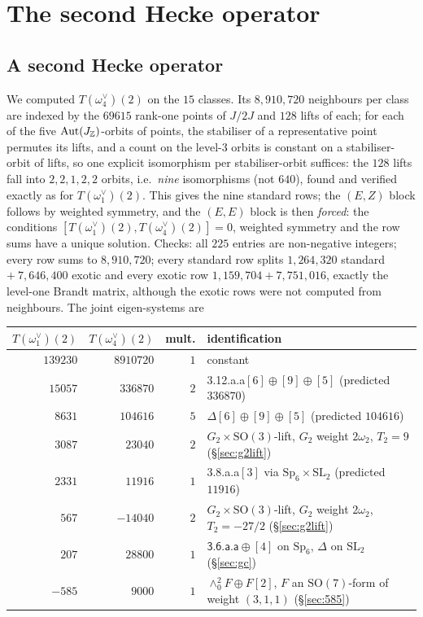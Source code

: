 \documentclass[11pt]{amsart}
\theoremstyle{definition}
\newcommand{\Z}{\mathbb{Z}}\newcommand{\Q}{\mathbb{Q}}\newcommand{\R}{\mathbb{R}}\newcommand{\A}{\mathbb{A}}\newcommand{\F}{\mathbb{F}}
\begin{document}
\section{The second Hecke operator}
\subsection{A second Hecke operator}\label{sec:T4} We computed $T(\omega_4^\vee)(2)$ on the $15$ classes. Its $8{,}910{,}720$ neighbours per class are indexed by the $69615$ rank-one points of $J/2J$ and $128$ lifts of each; for each of the five $\Aut(J_\Z)$-orbits of points, the stabiliser of a representative point permutes its lifts, and a count on the level-$3$ orbits is constant on a stabiliser-orbit of lifts, so one explicit isomorphism per stabiliser-orbit suffices: the $128$ lifts fall into $2,2,1,2,2$ orbits, i.e.\ \emph{nine} isomorphisms (not $640$), found and verified exactly as for $T(\omega_1^\vee)(2)$. This gives the nine standard rows; the $(E,Z)$ block follows by weighted symmetry, and the $(E,E)$ block is then \emph{forced}: the conditions $[T(\omega_1^\vee)(2),T(\omega_4^\vee)(2)]=0$, weighted symmetry and the row sums have a unique solution. Checks: all $225$ entries are non-negative integers; every row sums to $8{,}910{,}720$; every standard row splits $1{,}264{,}320$ standard $+\ 7{,}646{,}400$ exotic and every exotic row $1{,}159{,}704+7{,}751{,}016$, exactly the level-one Brandt matrix, although the exotic rows were not computed from neighbours. The joint eigen-systems are
\begin{center}\small
\begin{tabular}{@{}rrrl@{}}\toprule
$T(\omega_1^\vee)(2)$ & $T(\omega_4^\vee)(2)$ & mult. & identification\\\midrule
$139230$ & $8910720$ & $1$ & constant\\
$15057$ & $336870$ & $2$ & \textsf{3.12.a.a}$[6]\oplus[9]\oplus[5]$ (predicted $336870$)\\
$8631$ & $104616$ & $5$ & $\Delta[6]\oplus[9]\oplus[5]$ (predicted $104616$)\\
$3087$ & $23040$ & $2$ & $G_2\times\mathrm{SO}(3)$-lift, $G_2$ weight $2\omega_2$, $T_2=9$ (\S\ref{sec:g2lift})\\
$2331$ & $11916$ & $1$ & \textsf{3.8.a.a}$[3]$ via $\mathrm{Sp}_6\times\mathrm{SL}_2$ (predicted $11916$)\\
$567$ & $-14040$ & $2$ & $G_2\times\mathrm{SO}(3)$-lift, $G_2$ weight $2\omega_2$, $T_2=-27/2$ (\S\ref{sec:g2lift})\\
$207$ & $28800$ & $1$ & $\textsf{3.6.a.a}\oplus[4]$ on $\mathrm{Sp}_6$, $\Delta$ on $\mathrm{SL}_2$ (\S\ref{sec:gc})\\
$-585$ & $9000$ & $1$ & $\wedge^2_0F\oplus F[2]$, $F$ an $\mathrm{SO}(7)$-form of weight $(3,1,1)$ (\S\ref{sec:585})\\\bottomrule
\end{tabular}
\end{center}
\end{document}
